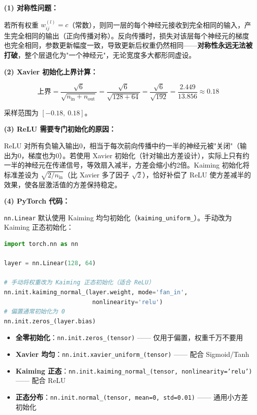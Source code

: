 \documentclass[a4paper,11pt]{ctexart}
\begin{document}
\begin{solutionbox}[参考答案与详细解析]
    \textbf{(1) 对称性问题：}

    若所有权重 $w_{ij}^{(l)} = c$（常数），则同一层的每个神经元接收到完全相同的输入，产生完全相同的输出（正向传播对称）。反向传播时，损失对该层每个神经元的梯度也完全相同，参数更新幅度一致，导致更新后权重仍然相同——\textbf{对称性永远无法被打破}，整个层退化为"一个神经元"，无论宽度多大都形同虚设。

    \vspace{0.5em}
    \textbf{(2) Xavier 初始化上界计算：}

    \[
    \text{上界} = \frac{\sqrt{6}}{\sqrt{n_{\text{in}}+n_{\text{out}}}} = \frac{\sqrt{6}}{\sqrt{128+64}} = \frac{\sqrt{6}}{\sqrt{192}} = \frac{2.449}{13.856} \approx \boxed{0.18}
    \]

    采样范围为 $[-0.18,\ 0.18]$。

    \vspace{0.5em}
    \textbf{(3) ReLU 需要专门初始化的原因：}

    ReLU 对所有负输入输出0，相当于每次前向传播中约一半的神经元被"关闭"（输出为0，梯度也为0）。若使用 Xavier 初始化（针对输出方差设计），实际上只有约一半的神经元在传递信号，等效扇入减半，方差会缩小约2倍。Kaiming 初始化将标准差设为 $\sqrt{2/n_{\text{in}}}$（比 Xavier 多了因子 $\sqrt{2}$），恰好补偿了 ReLU 使方差减半的效果，使各层激活值的方差保持稳定。

    \vspace{0.5em}
    \textbf{(4) PyTorch 代码：}

    \texttt{nn.Linear} 默认使用 Kaiming 均匀初始化（\texttt{kaiming\_uniform\_}）。手动改为 Kaiming 正态初始化：

    \begin{lstlisting}[language=Python]
import torch.nn as nn

layer = nn.Linear(128, 64)

# 手动将权重改为 Kaiming 正态初始化（适合 ReLU）
nn.init.kaiming_normal_(layer.weight, mode='fan_in',
                         nonlinearity='relu')
# 偏置通常初始化为 0
nn.init.zeros_(layer.bias)
    \end{lstlisting}

    \begin{keybox}[常用初始化方法速查]
        \begin{itemize}
            \item \textbf{全零初始化}：\texttt{nn.init.zeros\_(tensor)} —— 仅用于偏置，权重千万不要用
            \item \textbf{Xavier 均匀}：\texttt{nn.init.xavier\_uniform\_(tensor)} —— 配合 Sigmoid/Tanh
            \item \textbf{Kaiming 正态}：\texttt{nn.init.kaiming\_normal\_(tensor, nonlinearity='relu')} —— 配合 ReLU
            \item \textbf{正态分布}：\texttt{nn.init.normal\_(tensor, mean=0, std=0.01)} —— 通用小方差初始化
        \end{itemize}
    \end{keybox}
\end{solutionbox}
\end{document}
